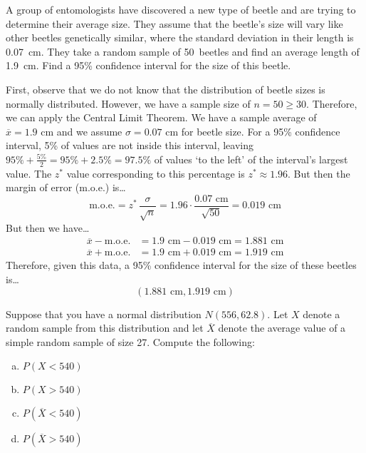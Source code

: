 \documentclass[11pt,letterpaper]{article}
\begin{document}

 A group of entomologists have discovered a new type of beetle and are trying to determine their average size. They assume that the beetle's size will vary like other beetles genetically similar, where the standard deviation in their length is 0.07~cm. They take a random sample of 50~beetles and find an average length of 1.9~cm. Find a 95\% confidence interval for the size of this beetle. \pspace

\sol First, observe that we do not know that the distribution of beetle sizes is normally distributed. However, we have a sample size of $n= 50 \geq 30$. Therefore, we can apply the Central Limit Theorem. We have a sample average of $\overline{x}= 1.9 \text{ cm}$ and we assume $\sigma= 0.07 \text{ cm}$ for beetle size. For a 95\% confidence interval, 5\% of values are not inside this interval, leaving $95\% + \frac{5\%}{2}= 95\% + 2.5\%= 97.5\%$ of values `to the left' of the interval's largest value. The $z^*$ value corresponding to this percentage is $z^* \approx 1.96$. But then the margin of error (m.o.e.) is\dots
	\[
	\text{m.o.e.}= z^* \,\dfrac{\sigma}{\sqrt{n}}= 1.96 \cdot \dfrac{0.07 \text{ cm}}{\sqrt{50}}= 0.019 \text{ cm}
	\]
But then we have\dots
	\[
	\begin{aligned}
	\overline{x} - \text{m.o.e.}&= 1.9 \text{ cm} - 0.019 \text{ cm}= 1.881 \text{ cm} \\[0.3cm]
	\overline{x} + \text{m.o.e.}&= 1.9 \text{ cm} + 0.019 \text{ cm}= 1.919 \text{ cm}
	\end{aligned}
	\] \pspace
Therefore, given this data, a 95\% confidence interval for the size of these beetles is\dots
	\[
	(1.881 \text{ cm}, 1.919 \text{ cm})
	\]



\newpage



 Suppose that you have a normal distribution $N(556, 62.8)$. Let $X$ denote a random sample from this distribution and let $\overline{X}$ denote the average value of a simple random sample of size 27. Compute the following:
	\begin{enumerate}[(a)]
	\item $P(X < 540)$
	\item $P(X > 540)$
	\item $P(\overline{X} < 540)$
	\item $P(\overline{X} > 540)$
	\end{enumerate} \pspace
\end{document}
